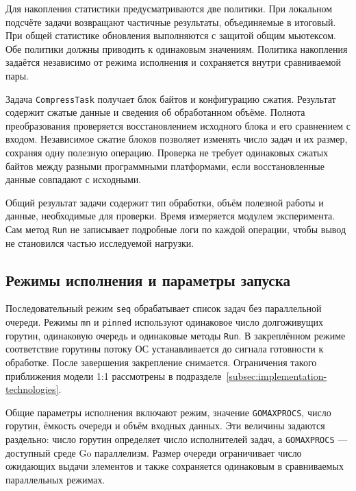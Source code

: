 Для накопления статистики предусматриваются две политики. При локальном подсчёте задачи возвращают
  частичные результаты, объединяемые в итоговый. При общей статистике обновления выполняются
  с защитой общим мьютексом. Обе политики должны приводить к одинаковым значениям. Политика
  накопления задаётся независимо от режима исполнения и сохраняется внутри сравниваемой пары.

Задача \texttt{CompressTask} получает блок байтов и конфигурацию сжатия. Результат содержит
  сжатые данные и сведения об обработанном объёме. Полнота преобразования проверяется восстановлением
  исходного блока и его сравнением с входом. Независимое сжатие блоков позволяет изменять число
  задач и их размер, сохраняя одну полезную операцию. Проверка не требует одинаковых сжатых байтов
  между разными программными платформами, если восстановленные данные совпадают с исходными.

Общий результат задачи содержит тип обработки, объём полезной работы и данные, необходимые для
  проверки. Время измеряется модулем эксперимента. Сам метод \texttt{Run} не записывает подробные
  логи по каждой операции, чтобы вывод не становился частью исследуемой нагрузки.


\subsection{Режимы исполнения и параметры запуска}
\label{subsec:execution-requirements}

Последовательный режим \texttt{seq} обрабатывает список задач без параллельной очереди.
  Режимы \texttt{mn} и \texttt{pinned} используют одинаковое число долгоживущих горутин,
  одинаковую очередь и одинаковые методы \texttt{Run}. В закреплённом режиме соответствие
  горутины потоку ОС устанавливается до сигнала готовности к обработке. После завершения
  закрепление снимается. Ограничения такого приближения модели 1:1 рассмотрены
  в подразделе~\ref{subsec:implementation-technologies}.

Общие параметры исполнения включают режим, значение \texttt{GOMAXPROCS}, число горутин,
  ёмкость очереди и объём входных данных. Эти величины задаются раздельно: число горутин определяет
  число исполнителей задач, а \texttt{GOMAXPROCS} — доступный среде Go параллелизм.
  Размер очереди ограничивает число ожидающих выдачи элементов и также сохраняется одинаковым
  в сравниваемых параллельных режимах.

